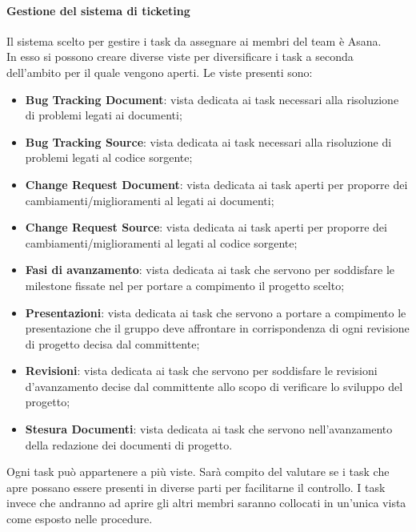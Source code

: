 			\paragraph{Gestione del sistema di ticketing} %
			\label{par:gestione_del_sistema_di_ticketing}
			Il sistema scelto per gestire i task\gloss{} da assegnare ai membri del team è Asana\gloss{}. \\
			In esso si possono creare diverse viste per diversificare i task\gloss{} a seconda dell'ambito per il quale vengono aperti. Le viste presenti sono:
				\begin{itemize}
					\item \textbf{Bug\gloss{} Tracking Document}: vista dedicata ai task\gloss{} necessari alla risoluzione di problemi legati ai documenti;
					\item \textbf{Bug\gloss{} Tracking Source}: vista dedicata ai task\gloss{} necessari alla risoluzione di problemi legati al codice sorgente;
					\item \textbf{Change Request Document}: vista dedicata ai task\gloss{} aperti per proporre dei cambiamenti/miglioramenti al \roleProjectManager{} legati ai documenti;
					\item \textbf{Change Request Source}: vista dedicata ai task\gloss{} aperti per proporre dei cambiamenti/miglioramenti al \roleProjectManager{} legati al codice sorgente;
					\item \textbf{Fasi di avanzamento}: vista dedicata ai task\gloss{} che servono per soddisfare le milestone\gloss{} fissate nel \docNameVersionPdP per portare a compimento il progetto scelto;
					\item \textbf{Presentazioni}: vista dedicata ai task\gloss{} che servono a portare a compimento le presentazione che il gruppo \groupName{} deve affrontare in corrispondenza di ogni revisione di progetto decisa dal committente\gloss{};
					\item \textbf{Revisioni}: vista dedicata ai task\gloss{} che servono per soddisfare le revisioni d'avanzamento decise dal committente\gloss{} allo scopo di verificare lo sviluppo del progetto;
					\item \textbf{Stesura Documenti}: vista dedicata ai task\gloss{} che servono nell'avanzamento della redazione dei documenti di progetto.
				\end{itemize}
			\noindent
			Ogni task\gloss{} può appartenere a più viste. Sarà compito del \roleProjectManager{} valutare se i task che apre possano essere presenti in diverse parti per facilitarne il controllo. I task invece che andranno ad aprire gli altri membri saranno collocati in un'unica vista come esposto nelle procedure.
			
